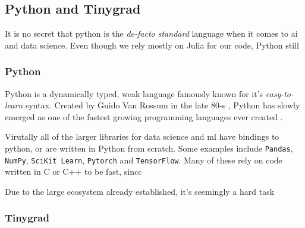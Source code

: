 \subsection{Python and Tinygrad}
\label{back:tiny}

It is no secret that python is the \textit{de-facto standard} language when it comes to \acrshort{ai} and data science. Even though we rely mostly on Julia for our code, Python still 




\subsubsection{Python}

Python is a dynamically typed, weak language famously known for it's \textit{easy-to-learn} syntax. Created by Guido Van Rossum in the late 80-s \cite{python}, Python has slowly emerged as one of the fastest growing programming languages ever created \cite{srinath2017python}. 

Virutally all of the larger libraries for data science and \acrlong{ml} have bindings to \gls{python}, or are written in Python from scratch. Some examples include \texttt{Pandas}, \texttt{NumPy}, \texttt{SciKit Learn}, \texttt{Pytorch} and \texttt{TensorFlow}. Many of these rely on code written in C or C++ to be fast, sincc

Due to the large ecosystem already established, it's seemingly a hard task  \\

\subsubsection{Tinygrad}

